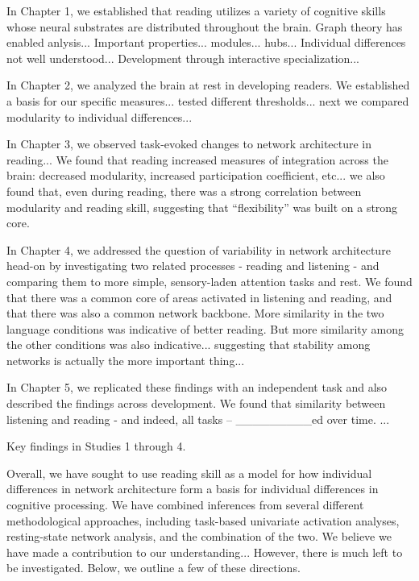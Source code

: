 In Chapter 1, we established that reading utilizes a variety of cognitive skills whose neural substrates are distributed throughout the brain. Graph theory has enabled anlysis...
Important properties... modules... hubs...
Individual differences not well understood...
Development through interactive specialization...

In Chapter 2, we analyzed the brain at rest in developing readers. We established a basis for our specific measures... tested different thresholds... next we compared modularity to individual differences...

In Chapter 3, we observed task-evoked changes to network architecture in reading... We found that reading increased measures of integration across the brain: decreased modularity, increased participation coefficient, etc... we also found that, even during reading, there was a strong correlation between modularity and reading skill, suggesting that ``flexibility'' was built on a strong core.

In Chapter 4, we addressed the question of variability in network architecture head-on by investigating two related processes - reading and listening - and comparing them to more simple, sensory-laden attention tasks and rest. We found that there was a common core of areas activated in listening and reading, and that there was also a common network backbone. More similarity in the two language conditions was indicative of better reading. But more similarity among the other conditions was also indicative... suggesting that stability among networks is actually the more important thing...

In Chapter 5, we replicated these findings with an independent task and also described the findings across development. We found that similarity between listening and reading - and indeed, all tasks -- _________ed over time. ...

\begin{table}[t]
	\renewcommand{\tabcolsep}{0.09cm}
	\centering
	
	\caption[Key findings.]{Key findings in Studies 1 through 4.}
	\label{table:ch6-key-findings}
\end{table}

Overall, we have sought to use reading skill as a model for how individual differences in network architecture form a basis for individual differences in cognitive processing. We have combined inferences from several different methodological approaches, including task-based univariate activation analyses, resting-state network analysis, and the combination of the two. We believe we have made a contribution to our understanding... However, there is much left to be investigated. Below, we outline a few of these directions.

